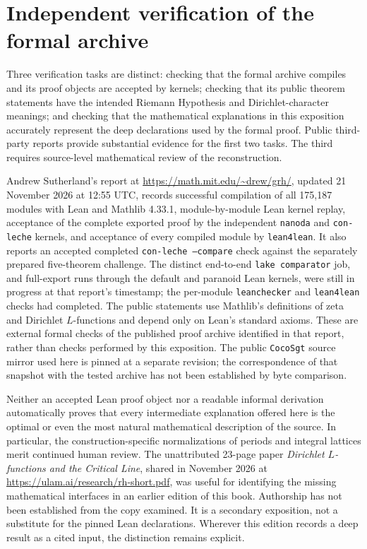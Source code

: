 \documentclass[11pt,openany,oneside]{scrbook}
\theoremstyle{definition}
\theoremstyle{remark}
\begin{document}
\section{Independent verification of the formal archive}\label{app:verification}
\enlargethispage{2\baselineskip}

Three verification tasks are distinct: checking that the formal archive compiles and its proof objects are accepted by kernels; checking that its public theorem statements have the intended Riemann Hypothesis and Dirichlet-character meanings; and checking that the mathematical explanations in this exposition accurately represent the deep declarations used by the formal proof. Public third-party reports provide substantial evidence for the first two tasks. The third requires source-level mathematical review of the reconstruction.

Andrew Sutherland's report at \url{https://math.mit.edu/~drew/grh/}, updated 21 November 2026 at 12:55 UTC, records successful compilation of all 175,187 modules with Lean and Mathlib 4.33.1, module-by-module Lean kernel replay, acceptance of the complete exported proof by the independent \texttt{nanoda} and \texttt{con-leche} kernels, and acceptance of every compiled module by \texttt{lean4lean}. It also reports an accepted completed \texttt{con-leche --compare} check against the separately prepared five-theorem challenge. The distinct end-to-end \texttt{lake comparator} job, and full-export runs through the default and paranoid Lean kernels, were still in progress at that report's timestamp; the per-module \texttt{leanchecker} and \texttt{lean4lean} checks had completed. The public statements use Mathlib's definitions of zeta and Dirichlet $L$-functions and depend only on Lean's standard axioms. These are external formal checks of the published proof archive identified in that report, rather than checks performed by this exposition. The public \texttt{CocoSgt} source mirror used here is pinned at a separate revision; the correspondence of that snapshot with the tested archive has not been established by byte comparison.

Neither an accepted Lean proof object nor a readable informal derivation automatically proves that every intermediate explanation offered here is the optimal or even the most natural mathematical description of the source.  In particular, the construction-specific normalizations of periods and integral lattices merit continued human review.  The unattributed 23-page paper \emph{Dirichlet $L$-functions and the Critical Line}, shared in November 2026 at \url{https://ulam.ai/research/rh-short.pdf}, was useful for identifying the missing mathematical interfaces in an earlier edition of this book.  Authorship has not been established from the copy examined.  It is a secondary exposition, not a substitute for the pinned Lean declarations.  Wherever this edition records a deep result as a cited input, the distinction remains explicit.
\end{document}
